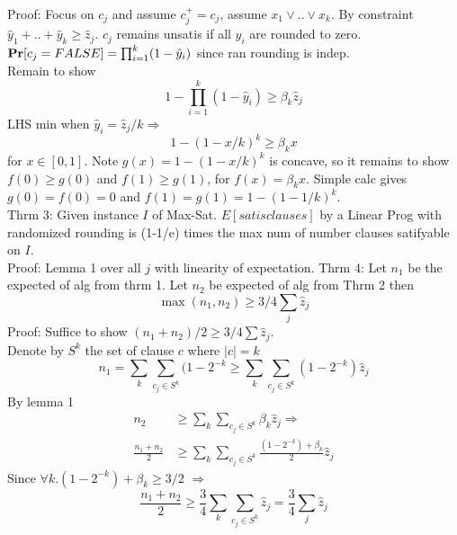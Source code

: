 \documentclass[a4paper]{article}
\def\Pr{\mbox{\textbf{Pr}}}
\begin{document}
Proof: Focus on \(c_j\) and assume \(c_j^+=c_j\), assume \(x_1 \vee .. \vee x_k\).
By constraint \(\hat{y}_1+..+\hat{y}_k \geq \hat{z}_j\). \(c_j\) remains unsatis if all \(y_i\) are rounded to zero.\\
\(\Pr[c_j=FALSE]=\prod_{i=1}^k(1-\hat{y}_i)\) since ran rounding is indep.\\
Remain to show
\[ 1-\prod_{i=1}^k (1 - \hat{y}_i) \geq \beta_k \hat{z}_j\]
LHS min when \(\hat{y}_i = \hat{z}_j/k \Rightarrow\)
\[1-(1-x/k)^k \geq \beta_{k} x\]
for \(x\in[0,1]\). Note \(g(x) = 1-(1-x/k)^k\) is concave, so it remains to show \(f(0)\geq g(0)\) and \(f(1) \geq g(1)\), for \(f(x)=\beta_k x\). Simple calc gives \(g(0)=f(0)=0\) and \(f(1)=g(1)=1-(1-1/k)^k\).\\
Thrm 3: Given instance \(I\) of Max-Sat. \(E[satis clauses]\) by a Linear Prog with randomized rounding is (1-1/e) times the max num of number clauses satifyable on \(I\).\\
Proof: Lemma 1 over all \(j\) with linearity of expectation. 
Thrm 4: Let \(n_1\) be the expected of alg from thrm 1. Let \(n_2\) be expected of alg from Thrm 2 then 
\[\max(n_1,n_2)\geq 3/4 \sum_j \hat{z}_j\]
Proof: Suffice to show  \((n_1 + n_2)/2 \geq 3/4 \sum \hat{z}_j\).\\
Denote by \(S^k\) the set of clause \(c\) where \(|c|=k\)
\[n_1 = \sum_k \sum_{c_j \in S^k} (1-2^{-k} \geq \sum_k \sum_{c_j \in S^k} (1-2^{-k})\hat{z}_j\]
By lemma 1
\begin{align*}
n_2 &\geq \sum_k \sum_{c_j \in S^k} \beta_k \hat{z}_j \Rightarrow\\
\frac{n_1+n_2}{2} &\geq \sum_k \sum_{c_j \in S^k} \frac{(1-2^{-k})+\beta_k}{2}\hat{z}_j
\end{align*}
Since \( \forall k. (1-2^{-k}) + \beta_k \geq 3/2\) \(\Rightarrow\)
\[\frac{n_1+n_2}{2} \geq \frac{3}{4} \sum_k\sum_{c_j \in S^k} \hat{z}_j = \frac{3}{4} \sum_j \hat{z}_j\]
\end{document}
